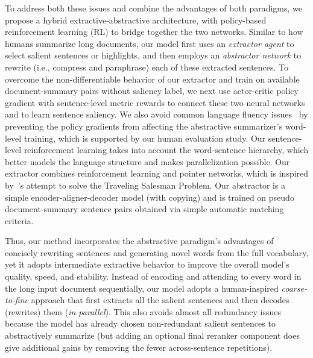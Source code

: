 \documentclass[11pt,a4paper]{article}
\begin{document}
To address both these issues and combine the advantages of both paradigms, we propose a hybrid extractive-abstractive architecture, with policy-based reinforcement learning (RL) to bridge together the two networks.
Similar to how humans summarize long documents, our model first uses an \emph{extractor agent} to select salient sentences or highlights, and then employs an \emph{abstractor network} to rewrite (i.e., compress and paraphrase) each of these extracted sentences.
To overcome the non-differentiable behavior of our extractor and train on available document-summary pairs without saliency label, we next use actor-critic policy gradient with sentence-level metric rewards to connect these two neural networks and to learn sentence saliency.
We also avoid common language fluency issues~\citep{DBLP:journals/corr/PaulusXS17} by preventing the policy gradients from affecting the abstractive summarizer's word-level training, which is supported by our human evaluation study.
Our sentence-level reinforcement learning takes into account the word-sentence hierarchy, which better models the language structure and makes parallelization possible. Our extractor combines reinforcement learning and pointer networks, which is inspired by~\citet{RL_comb:45821}'s attempt to solve the Traveling Salesman Problem. Our abstractor is a simple encoder-aligner-decoder model (with copying) and is trained on pseudo document-summary sentence pairs obtained via simple automatic matching criteria.


Thus, our method incorporates the abstractive paradigm's advantages of concisely rewriting sentences and generating novel words from the full vocabulary, yet it adopts intermediate extractive behavior to improve the overall model's quality, speed, and stability. Instead of encoding and attending to every word in the long input document sequentially, our model adopts a human-inspired \emph{coarse-to-fine} approach that first extracts all the salient sentences and then decodes (rewrites) them (\emph{in parallel}).
This also avoids almost all redundancy issues because the model has already chosen non-redundant salient sentences to abstractively summarize (but adding an optional final reranker component does give additional gains by removing the fewer across-sentence repetitions).
\end{document}
